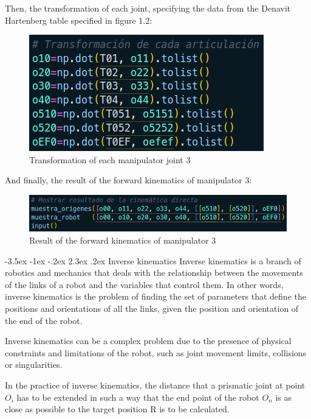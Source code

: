 \documentclass[11pt]{report}
\makeatletter
\renewcommand\chapter{\@startsection{chapter}{0}{\z@}%
    {-3.5ex \@plus -1ex \@minus -.2ex}%
    {2.3ex \@plus.2ex}%
    {\normalfont\Large\bfseries}}
\makeatother
\begin{document}
Then, the transformation of each joint, specifying the data from the Denavit Hartenberg table specified in figure 1.2:
\begin{figure}[H]
  \centering
  \includegraphics[scale=0.5]{img/transformacion_articulacion.png}
  \caption{Transformation of each manipulator joint 3}
\end{figure}

And finally, the result of the forward kinematics of manipulator 3:
\begin{figure}[H]
  \centering
  \includegraphics[scale=0.5]{img/resultado_cd.png}
  \caption{Result of the forward kinematics of manipulator 3}
\end{figure}

\newpage

\chapter{Inverse kinematics}
Inverse kinematics is a branch of robotics and mechanics that deals with the relationship between the movements of the
links of a robot and the variables that control them. In other words, inverse kinematics is the problem of finding the 
set of parameters that define the positions and orientations of all the links, given the position and orientation of 
the end of the robot.

Inverse kinematics can be a complex problem due to the presence of physical constraints and limitations of the robot, 
such as joint movement limits, collisions or singularities.

In the practice of inverse kinematics, the distance that a prismatic joint at point $O_i$ has to be extended in such a 
way that the end point of the robot $O_n$ is as close as possible to the target position R is to be calculated.
\end{document}
